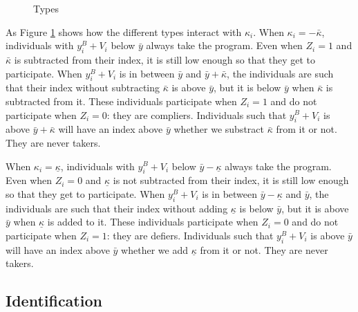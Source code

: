 \documentclass[
]{book}
\theoremstyle{definition}
\theoremstyle{definition}
\theoremstyle{definition}
\theoremstyle{definition}
\theoremstyle{remark}
\begin{document}
\begin{figure}[htbp]

{\centering {}

}

\caption{Types}\label{fig:plottypes}
\end{figure}

As Figure \ref{fig:plottypes} shows how the different types interact with \(\kappa_i\).
When \(\kappa_i=-\bar{\kappa}\), individuals with \(y_i^B+V_i\) below \(\bar{y}\) always take the program.
Even when \(Z_i=1\) and \(\bar{\kappa}\) is subtracted from their index, it is still low enough so that they get to participate.
When \(y_i^B+V_i\) is in between \(\bar{y}\) and \(\bar{y}+\bar{\kappa}\), the individuals are such that their index without subtracting \(\bar{\kappa}\) is above \(\bar{y}\), but it is below \(\bar{y}\) when \(\bar{\kappa}\) is subtracted from it.
These individuals participate when \(Z_i=1\) and do not participate when \(Z_i=0\): they are compliers.
Individuals such that \(y_i^B+V_i\) is above \(\bar{y}+\bar{\kappa}\) will have an index above \(\bar{y}\) whether we substract \(\bar{\kappa}\) from it or not.
They are never takers.

When \(\kappa_i=\underline{\kappa}\), individuals with \(y_i^B+V_i\) below \(\bar{y}-\underline{\kappa}\) always take the program.
Even when \(Z_i=0\) and \(\underline{\kappa}\) is not subtracted from their index, it is still low enough so that they get to participate.
When \(y_i^B+V_i\) is in between \(\bar{y}-\underline{\kappa}\) and \(\bar{y}\), the individuals are such that their index without adding \(\underline{\kappa}\) is below \(\bar{y}\), but it is above \(\bar{y}\) when \(\underline{\kappa}\) is added to it.
These individuals participate when \(Z_i=0\) and do not participate when \(Z_i=1\): they are defiers.
Individuals such that \(y_i^B+V_i\) is above \(\bar{y}\) will have an index above \(\bar{y}\) whether we add \(\underline{\kappa}\) from it or not.
They are never takers.

\hypertarget{identification-4}{%
\subsection{Identification}\label{identification-4}}
\end{document}
